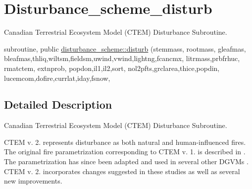 \hypertarget{group__disturbance__scheme__disturb}{}\section{Disturbance\+\_\+scheme\+\_\+disturb}
\label{group__disturbance__scheme__disturb}


Canadian Terrestrial Ecosystem Model (C\+T\+E\+M) Disturbance Subroutine.  


\begin{DoxyCompactItemize}
\item 
subroutine, public \hyperlink{group__disturbance__scheme__disturb_gae9a0c3412bfa04257e8b3a7475f4cd1d}{disturbance\+\_\+scheme\+::disturb} (stemmass, rootmass, gleafmas, bleafmas,thliq,wiltsm,fieldsm,uwind,vwind,lightng,fcancmx, litrmass,prbfrhuc, rmatctem, extnprob, popdon,il1,il2,sort, nol2pfts,grclarea,thice,popdin, lucemcom,dofire,currlat,iday,fsnow,
\end{DoxyCompactItemize}


\subsection{Detailed Description}
Canadian Terrestrial Ecosystem Model (C\+T\+E\+M) Disturbance Subroutine. 

C\+T\+E\+M v. 2. represents disturbance as both natural and human-\/influenced fires. The original fire parametrization corresponding to C\+T\+E\+M v. 1. is described in \cite{Arora20052ac}. The parametrization has since been adapted and used in several other D\+G\+V\+Ms \cite{Kloster2010-633} \cite{Kloster2012-c79} \cite{Migliavacca2013-eh} \cite{Li20121c2}. C\+T\+E\+M v. 2. incorporates changes suggested in these studies as well as several new improvements.


